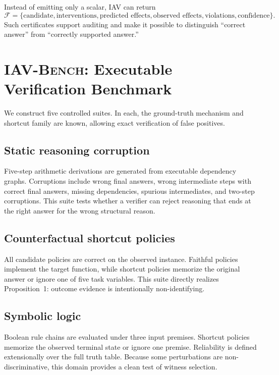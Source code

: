 \documentclass[10pt]{article}
\newcommand{\bench}{\textsc{IAV-Bench}}
\begin{document}
Instead of emitting only a scalar, IAV can return
\[
\mathcal{F}
=
\{\text{candidate},\text{interventions},\text{predicted effects},
\text{observed effects},\text{violations},\text{confidence}\}.
\]
Such certificates support auditing and make it possible to distinguish ``correct answer'' from ``correctly supported answer.''

\section{\bench{}: Executable Verification Benchmark}

We construct five controlled suites. In each, the ground-truth mechanism and shortcut family are known, allowing exact verification of false positives.

\subsection{Static reasoning corruption}

Five-step arithmetic derivations are generated from executable dependency graphs. Corruptions include wrong final answers, wrong intermediate steps with correct final answers, missing dependencies, spurious intermediates, and two-step corruptions. This suite tests whether a verifier can reject reasoning that ends at the right answer for the wrong structural reason.

\subsection{Counterfactual shortcut policies}

All candidate policies are correct on the observed instance. Faithful policies implement the target function, while shortcut policies memorize the original answer or ignore one of five task variables. This suite directly realizes Proposition~1: outcome evidence is intentionally non-identifying.

\subsection{Symbolic logic}

Boolean rule chains are evaluated under three input premises. Shortcut policies memorize the observed terminal state or ignore one premise. Reliability is defined extensionally over the full truth table. Because some perturbations are non-discriminative, this domain provides a clean test of witness selection.
\end{document}
